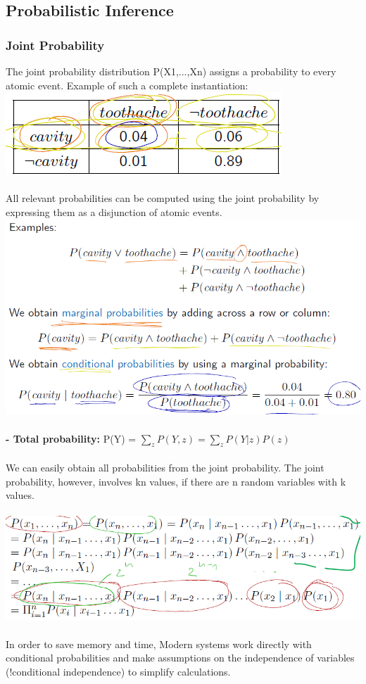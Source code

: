 \documentclass{article}
\begin{document}
\subsection{Probabilistic Inference}
\subsubsection{Joint Probability}
The joint probability distribution P(X1,...,Xn) assigns a probability to
every atomic event. Example of such a complete instantiation:\\
\includegraphics[scale=1]{60.png}\\\\
All relevant probabilities can be computed using the joint probability by
expressing them as a disjunction of atomic events.\\
\includegraphics[scale=0.8]{61.png}\\\\
\textbf{- Total probability:} P(Y) = $\sum_z P(Y,z) = \sum_z P(Y|z)P(z)$\\\\
We can easily obtain all probabilities from the joint probability. The joint probability, however, involves kn values, if there are n random variables with k values.\\\\
\includegraphics[scale=0.8]{62.png}\\\\
In order to save memory and time, Modern systems work directly with conditional probabilities and make assumptions on the independence of variables (!conditional independence) to simplify calculations.\\
\end{document}
